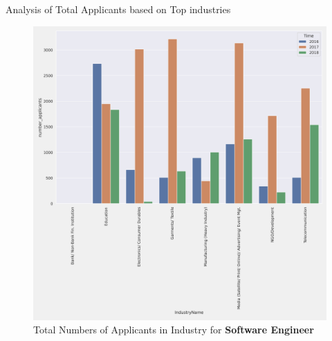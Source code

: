 \documentclass{article}
\begin{document}
\begin{table}[!htb]
	\centering
	\caption{Analysis of Total Applicants based on Top industries}
	\label{tab:wapp}
\end{table}
\begin{figure}[!h]
	\centering
	\label{fig:wapp}
	\caption{Total Numbers of Applicants in Industry for \textbf{Software Engineer}}
	\includegraphics[scale=0.5]{Graphs/Web Developer_number_applicants_ttest.png}
\end{figure}
\end{document}
